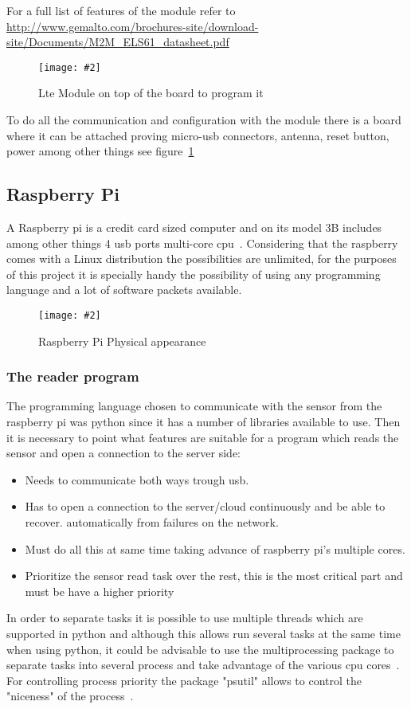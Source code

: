 \documentclass[hidelinks,11pt,a4paper,oneside,article]{memoir}
\newcommand{\putimage}[3][10] %
{
\begin{figure}[h]
	\centering
	\captionsetup{justification=centering}
	\texttt{[image: \#2]}
	\caption{#3}
	\label{fig:#2}
\end{figure}
}
\begin{document}
For a full list of features of the module refer to \url{http://www.gemalto.com/brochures-site/download-site/Documents/M2M_ELS61_datasheet.pdf}


	\putimage{lte_board}{Lte Module on top of the board to program it}
To do all the communication and configuration with the module there is a board where it can be attached proving micro-usb connectors, antenna, reset button, power among other things see figure~\ref{fig:lte_board}





\subsection{Raspberry Pi}
A Raspberry pi is a credit card sized computer and on its model 3B includes among other things 4 \gls{usb} ports multi-core \gls{cpu}~\cite{rpi3}. Considering that the raspberry comes with a Linux distribution the possibilities are unlimited, for the purposes of this project it is specially handy the possibility of using any programming language and a lot of software packets available.

\putimage{raspberry}{Raspberry Pi Physical appearance}

\subsubsection{The reader program}
The programming language chosen to communicate with the sensor from the raspberry pi was \gls{python} since it has a number of libraries available to use. Then it is necessary to point what features are suitable for a program which reads the sensor and open a connection to the server side:
\begin{itemize}
    \item Needs to communicate both ways trough \gls{usb}.
    \item Has to open a connection to the server/cloud continuously and be able to recover. automatically from failures on the network.
    \item Must do all this at same time taking advance of raspberry pi's multiple cores.
    \item Prioritize the sensor read task over the rest, this is the most critical part and must be have a higher priority
\end{itemize}



In order to separate tasks it is possible to use multiple threads which are supported in \gls{python} and although this allows run several tasks at the same time when using python, it could be advisable to use the multiprocessing package to separate tasks into several process and take advantage of the various \gls{cpu} cores~\cite{python-multi}. For controlling process priority the package "psutil" allows to control the "niceness" of the process~\cite{python-psutil}.
\end{document}
